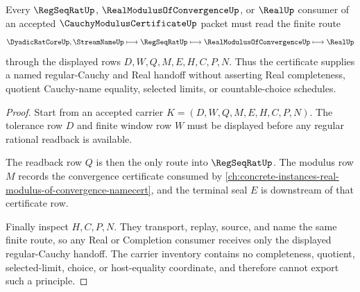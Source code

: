 \begin{theorem}
\label{thm:cauchy-modulus-certificate-regular-cauchy-route}
Every $\RegSeqRatUp$, $\RealModulusOfConvergenceUp$, or $\RealUp$ consumer of an accepted $\CauchyModulusCertificateUp$ packet must read the finite route
$$
\DyadicRatCoreUp,\StreamNameUp \longmapsto \RegSeqRatUp \longmapsto \RealModulusOfConvergenceUp \longmapsto \RealUp
$$
through the displayed rows $D,W,Q,M,E,H,C,P,N$. Thus the certificate supplies a named regular-Cauchy and Real handoff without asserting Real completeness, quotient Cauchy-name equality, selected limits, or countable-choice schedules.
\end{theorem}
\begin{proof}
Start from an accepted carrier $K=(D,W,Q,M,E,H,C,P,N)$. The tolerance row $D$ and finite window row $W$ must be displayed before any regular rational readback is available.

The readback row $Q$ is then the only route into $\RegSeqRatUp$. The modulus row $M$ records the convergence certificate consumed by \autoref{ch:concrete-instances-real-modulus-of-convergence-namecert}, and the terminal seal $E$ is downstream of that certificate row.

Finally inspect $H,C,P,N$. They transport, replay, source, and name the same finite route, so any Real or Completion consumer receives only the displayed regular-Cauchy handoff. The carrier inventory contains no completeness, quotient, selected-limit, choice, or host-equality coordinate, and therefore cannot export such a principle.
\end{proof}




